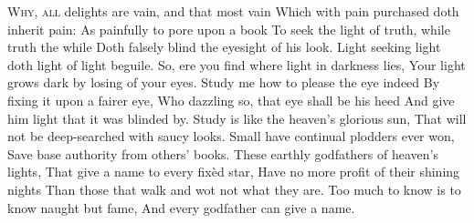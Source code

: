 \documentclass[fontsize=9, a5paper]{scrbook}
\newcommand\blankpage{%
    \null
    \thispagestyle{empty}%
    \addtocounter{page}{-1}%
    \newpage}
\begin{document}
\pagebreak

\begin{volumetitlepage}
\bigskip
\noindent{}
\end{volumetitlepage}

\pagebreak

\afterpage{\blankpage}
\begin{poem}
	\begin{stanza}
		\textsc{Why, all} delights are vain, and that most vain\verseline
		Which with pain purchased doth inherit pain:\verseline
		As painfully to pore upon a book\verseline
		 \verseindent To seek the light of truth, while truth the while\verseline
		Doth falsely blind the eyesight of his look.\verseline
		 \verseindent Light seeking light doth light of light beguile.\verseline
		So, ere you find where light in darkness lies,\verseline
		Your light grows dark by losing of your eyes.\verseline
		Study me how to please the eye indeed\verseline
		 \verseindent By fixing it upon a fairer eye,\verseline
		Who dazzling so, that eye shall be his heed\verseline
		 \verseindent And give him light that it was blinded by.\verseline
		Study is like the heaven’s glorious sun,\verseline
		 \verseindent That will not be deep-searched with saucy looks.\verseline
		Small have continual plodders ever won,\verseline
		 \verseindent Save base authority from others’ books.\verseline
		These earthly godfathers of heaven’s lights,\verseline
		 \verseindent That give a name to every fixèd star,\verseline
		Have no more profit of their shining nights\verseline
		 \verseindent Than those that walk and wot not what they are.\verseline
		Too much to know is to know naught but fame,\verseline
		And every godfather can give a name.
	\end{stanza}
\end{poem}
\end{document}
